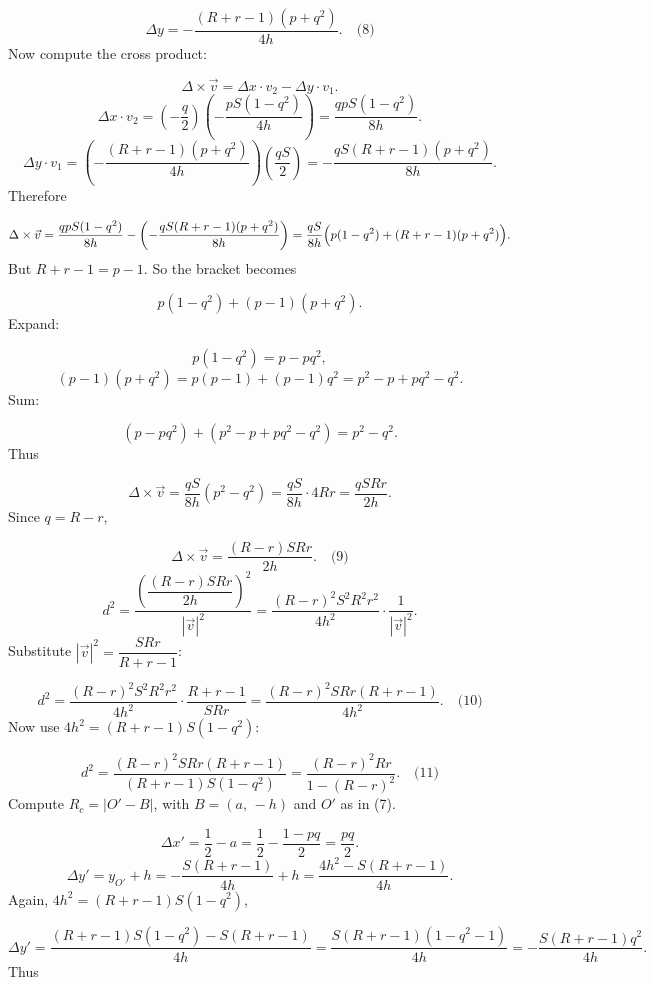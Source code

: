 \[
\Delta y = -\frac{ (R+r-1) (p + q^2)}{4h}. \quad\text{(8)}
\]
Now compute the cross product:\par
\[
\Delta \times \vec{v} = \Delta x \cdot v_2 - \Delta y \cdot v_1.
\]
\[
\Delta x \cdot v_2 = \left(-\frac{q}{2}\right)\left(-\frac{p S (1 - q^2)}{4h}\right) = \frac{q p S (1 - q^2)}{8h}.
\]
\[
\Delta y \cdot v_1 = \left(-\frac{ (R+r-1) (p + q^2)}{4h}\right) \left(\frac{q S}{2}\right) = -\frac{q S (R+r-1) (p + q^2)}{8h}.
\]
Therefore\par
\[
\Delta \times \vec{v} = \frac{q p S (1 - q^2)}{8h} - \left( -\frac{q S (R+r-1) (p + q^2)}{8h} \right)
= \frac{q S}{8h}\Bigl( p (1 - q^2) + (R+r-1)(p + q^2) \Bigr).
\]
But \(R+r-1 = p - 1\). So the bracket becomes\par
\[
p (1 - q^2) + (p - 1)(p + q^2).
\]
Expand:\par
\[
p(1 - q^2) = p - p q^2,
\]
\[
(p - 1)(p + q^2) = p(p-1) + (p-1)q^2 = p^2 - p + p q^2 - q^2.
\]
Sum:\par
\[
(p - p q^2) + (p^2 - p + p q^2 - q^2) = p^2 - q^2.
\]
Thus\par
\[
\Delta \times \vec{v} = \frac{q S}{8h} (p^2 - q^2) = \frac{q S}{8h} \cdot 4Rr = \frac{q S R r}{2 h}.
\]
Since \(q = R - r\),\par
\[
\Delta \times \vec{v} = \frac{ (R - r) S R r}{2 h}. \quad\text{(9)}
\]
\[
d^2 = \frac{ \left( \dfrac{ (R - r) S R r}{2 h} \right)^2 }{ |\vec{v}|^2 }
= \frac{ (R - r)^2 S^2 R^2 r^2}{4 h^2} \cdot \frac{1}{|\vec{v}|^2}.
\]
Substitute \(|\vec{v}|^2 = \dfrac{S R r}{R+r-1}\):\par
\[
d^2 = \frac{ (R - r)^2 S^2 R^2 r^2}{4 h^2} \cdot \frac{R+r-1}{S R r}
= \frac{ (R - r)^2 S R r (R+r-1)}{4 h^2}. \quad\text{(10)}
\]
Now use \(4h^2 = (R+r-1) S (1 - q^2)\):\par
\[
d^2 = \frac{ (R - r)^2 S R r (R+r-1)}{ (R+r-1) S (1 - q^2) }
= \frac{ (R - r)^2 R r}{1 - (R - r)^2}. \quad\text{(11)}
\]
Compute \(R_c = |O' - B|\), with \(B = (a,\,-h)\) and \(O'\) as in (7).\par
\[
\Delta x' = \frac12 - a = \frac12 - \frac{1 - p q}{2} = \frac{p q}{2}.
\]
\[
\Delta y' = y_{O'} + h = -\frac{S (R+r-1)}{4h} + h = \frac{4h^2 - S (R+r-1)}{4h}.
\]
Again, \(4h^2 = (R+r-1) S (1 - q^2)\),\par
\[
\Delta y' = \frac{ (R+r-1) S (1 - q^2) - S (R+r-1) }{4h} = \frac{ S (R+r-1) (1 - q^2 - 1)}{4h} = -\frac{ S (R+r-1) q^2}{4h}.
\]
Thus\par
